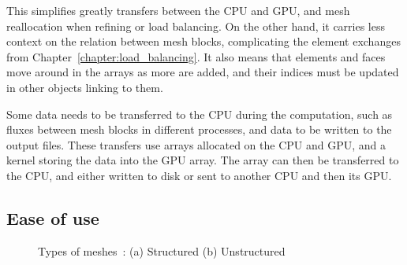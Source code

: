 This simplifies greatly transfers between the CPU and GPU, and mesh reallocation when refining or
load balancing. On the other hand, it carries less context on the relation between mesh blocks,
complicating the element exchanges from Chapter~\ref{chapter:load_balancing}. It also means that
elements and faces move around in the arrays as more are added, and their indices must be updated in
other objects linking to them. 

Some data needs to be transferred to the CPU during the computation, such as fluxes between mesh
blocks in different processes, and data to be written to the output files. These transfers use
arrays allocated on the CPU and GPU, and a kernel storing the data into the GPU array. The array can
then be transferred to the CPU, and either written to disk or sent to another CPU and then its GPU.

\subsection{Ease of use} \label{section:graphics_processing_units:data_structure:ease_of_use}

\begin{figure}[H]
	\centering
	\hfill
	\caption{Types of meshes~\cite{Clucas1999}: (a) Structured (b) Unstructured}
	\label{fig:mesh_types}
\end{figure}

